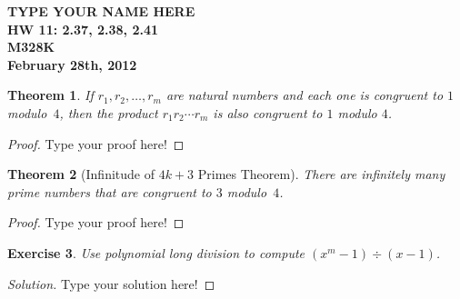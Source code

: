 \documentclass[12pt,leqno]{article}
\numberwithin{equation}{section}
\newtheorem{thm}{Theorem}[section]
\newtheorem{exer}[thm]{Exercise}
\theoremstyle{definition}
\begin{document}
\thispagestyle{plain}
\begin{flushright}
\large{\textbf{TYPE YOUR NAME HERE \\
HW 11: 2.37, 2.38, 2.41\\
M328K \\
February 28th, 2012 \\}}
\end{flushright}

\markboth{}{} \setcounter{section}{0} \baselineskip=18pt

\setcounter{tocdepth}{4}



\setcounter{section}{2}

\setcounter{thm}{36}


\begin{thm}
If $r_1, r_2, \hdots, r_m$ are natural numbers and each one is
congruent to $1$ modulo~$4$, then the product $r_1r_2 \cdots r_m$ is
also congruent to $1$ modulo $4$.
\end{thm}

\begin{proof}[Proof]
Type your proof here!
\end{proof}



\begin{thm}[Infinitude of $4k + 3$ Primes Theorem]
There are infinitely many prime numbers that are congruent to $3$
modulo~$4$.
\end{thm}

\begin{proof}[Proof]
Type your proof here!
\end{proof}


\setcounter{thm}{40}


\begin{exer}
Use  polynomial long division to compute $(x^m-1) \div (x-1)$.
\end{exer}

\begin{proof}[Solution]
Type your solution here!
\end{proof}
\end{document}
